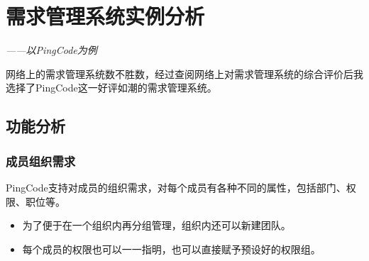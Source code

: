 \documentclass[12pt, a4paper, oneside]{ctexart}
\begin{document}
\section{需求管理系统实例分析}
\begin{center}
    {\vspace{-0.3cm}\textit{——以PingCode为例}}
\end{center}

网络上的需求管理系统数不胜数，经过查阅网络上对需求管理系统的综合评价后我选择了PingCode这一好评如潮的需求管理系统。

\subsection{功能分析}

\subsubsection{成员组织需求}

PingCode支持对成员的组织需求，对每个成员有各种不同的属性，包括部门、权限、职位等。
\begin{itemize}
    \item 为了便于在一个组织内再分组管理，组织内还可以新建团队。
    \item 每个成员的权限也可以一一指明，也可以直接赋予预设好的权限组。
\end{itemize}
\end{document}
